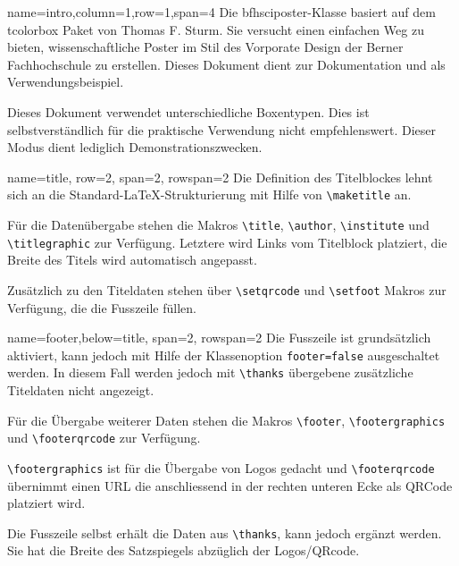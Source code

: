 \documentclass[
	paper=a0,%
	style=ruled, %
	]{bfhsciposter}
\newcommand{\tbs}{\textbackslash}
\let\code\texttt
\newcommand*{\macro}[1]{\code{\tbs#1}}
\let\pck\textsf
\let\cls\textsf
\begin{document}
\begin{tcbposter}[
		poster={
				columns=4,
				rows=7,
				spacing=1cm,
			},]

	\begin{posterboxenv}[,BFH-abstract,title=Abstract]{name=intro,column=1,row=1,span=4} %
		Die \cls{bfhsciposter}-Klasse basiert auf dem \pck{tcolorbox} Paket von Thomas F. Sturm.
		Sie versucht einen einfachen Weg zu bieten, wissenschaftliche Poster im Stil des Vorporate Design der Berner Fachhochschule zu erstellen. Dieses Dokument dient zur Dokumentation und als Verwendungsbeispiel.

		Dieses Dokument verwendet unterschiedliche Boxentypen. Dies ist selbstverständlich für die praktische Verwendung nicht empfehlenswert. Dieser Modus dient lediglich Demonstrationszwecken.
	\end{posterboxenv}

	\begin{posterboxenv}[title=Title]{name=title, row=2, span=2, rowspan=2}
		Die Definition des Titelblockes lehnt sich an die Standard-\LaTeX{}-Strukturierung  mit Hilfe von \macro{maketitle} an.

		Für die Datenübergabe stehen die Makros \macro{title}, \macro{author}, \macro{institute} und \macro{titlegraphic} zur Verfügung. Letztere wird Links vom Titelblock platziert, die Breite des Titels wird automatisch angepasst.

		Zusätzlich zu den Titeldaten stehen über \macro{setqrcode} und \macro{setfoot} Makros zur Verfügung, die die Fusszeile füllen.
	\end{posterboxenv}

	\begin{posterboxenv}[title=Footer]{name=footer,below=title, span=2, rowspan=2 }
		Die Fusszeile ist grundsätzlich aktiviert, kann jedoch mit Hilfe der Klassenoption \code{footer=false} ausgeschaltet werden. In diesem Fall werden jedoch mit \macro{thanks} übergebene zusätzliche Titeldaten nicht angezeigt.

		Für die Übergabe weiterer Daten stehen die Makros \macro{footer}, \macro{footergraphics} und \macro{footerqrcode} zur Verfügung.

		\macro{footergraphics} ist für die Übergabe von Logos gedacht und \macro{footerqrcode} übernimmt einen URL die anschliessend in der rechten unteren Ecke als QRCode platziert wird.

		Die Fusszeile selbst erhält die Daten aus \macro{thanks}, kann jedoch ergänzt werden. Sie hat die Breite des Satzspiegels abzüglich der Logos/QRcode.


\end{posterboxenv}
\end{tcbposter}
\end{document}
